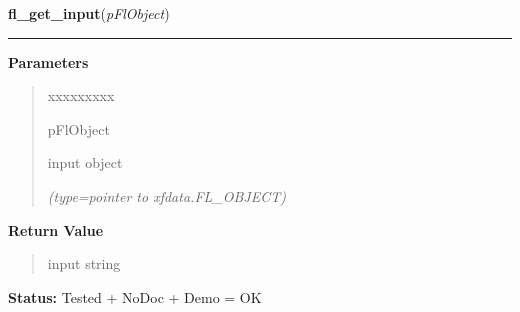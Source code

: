 \hspace{.8\funcindent}\begin{boxedminipage}{\funcwidth}

    \raggedright \textbf{fl\_get\_input}(\textit{pFlObject})

    \vspace{-1.5ex}

    \rule{\textwidth}{0.5\fboxrule}
\setlength{\parskip}{2ex}
\setlength{\parskip}{1ex}
      \textbf{Parameters}
      \vspace{-1ex}

      \begin{quote}
        \begin{Ventry}{xxxxxxxxx}

          \item[pFlObject]

          input object

            {\it (type=pointer to xfdata.FL\_OBJECT)}

        \end{Ventry}

      \end{quote}

      \textbf{Return Value}
    \vspace{-1ex}

      \begin{quote}
      input string

      \end{quote}

\textbf{Status:} Tested + NoDoc + Demo = OK



    \end{boxedminipage}

    \label{xformslib:flinput:fl_set_input_filter}

    \vspace{0.5ex}

